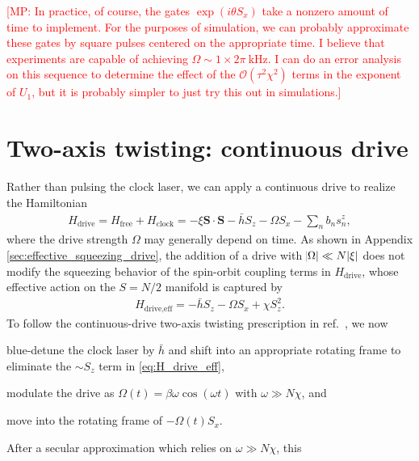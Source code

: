 \documentclass[aps,notitlepage,nofootinbib,11pt]{revtex4-1}
\renewcommand{\t}{\text} %
\newcommand{\p}[1]{\left(#1\right)} %
\renewcommand{\sp}[1]{\left[#1\right]} %
\renewcommand{\v}{\bm} %
\renewcommand{\c}{\cdot} %
\newcommand{\J}{\mathcal{J}}
\renewcommand{\O}{\mathcal{O}}
\newcommand{\1}{\hat{\mathds{1}}}
\newcommand{\note}[1]{\textcolor{red}{#1}}
\begin{document}
\note{[MP: In practice, of course, the gates $\exp\p{i\theta S_x}$
  take a nonzero amount of time to implement.  For the purposes of
  simulation, we can probably approximate these gates by square pulses
  centered on the appropriate time.  I believe that experiments are
  capable of achieving $\Omega\sim1\times2\pi~\t{kHz}$.  I can do an
  error analysis on this sequence to determine the effect of the
  $\O\p{\tau^2\chi^2}$ terms in the exponent of $U_1$, but it is
  probably simpler to just try this out in simulations.]}


\section{Two-axis twisting: continuous drive}

Rather than pulsing the clock laser, we can apply a continuous drive
to realize the Hamiltonian
\begin{align}
  H_{\t{drive}} = H_{\t{free}} + H_{\t{clock}}
  = -\xi\v S\c\v S - \bar h S_z - \Omega S_x - \sum_n b_n s_n^z,
\end{align}
where the drive strength $\Omega$ may generally depend on time.  As
shown in Appendix \ref{sec:effective_squeezing_drive}, the addition of
a drive with $\abs{\Omega}\ll N\abs{\xi}$ does not modify the
squeezing behavior of the spin-orbit coupling terms in
$H_{\t{drive}}$, whose effective action on the $S=N/2$ manifold is
captured by
\begin{align}
  H_{\t{drive,eff}} = -\bar h S_z - \Omega S_x + \chi S_z^2.
  \label{eq:H_drive_eff}
\end{align}
To follow the continuous-drive two-axis twisting prescription in
ref.~\cite{huang2015twoaxis}, we now
\begin{enumerate*}[label=(\roman*)]
\item blue-detune the clock laser by $\bar h$ and shift into an
  appropriate rotating frame to eliminate the $\sim S_z$ term in
  \eqref{eq:H_drive_eff},
\item modulate the drive as $\Omega\p{t}=\beta\omega\cos\p{\omega t}$
  with $\omega\gg N\chi$, and
\item move into the rotating frame of $-\Omega\p{t}S_x$.
\end{enumerate*}
After a secular approximation which relies on $\omega\gg N\chi$, this
\end{document}

